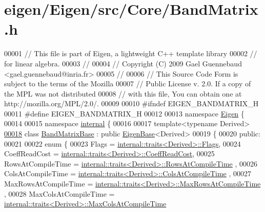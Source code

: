 \hypertarget{eigen_2_eigen_2src_2_core_2_band_matrix_8h_source}{}\section{eigen/\+Eigen/src/\+Core/\+Band\+Matrix.h}
\label{eigen_2_eigen_2src_2_core_2_band_matrix_8h_source}

\begin{DoxyCode}
00001 \textcolor{comment}{// This file is part of Eigen, a lightweight C++ template library}
00002 \textcolor{comment}{// for linear algebra.}
00003 \textcolor{comment}{//}
00004 \textcolor{comment}{// Copyright (C) 2009 Gael Guennebaud <gael.guennebaud@inria.fr>}
00005 \textcolor{comment}{//}
00006 \textcolor{comment}{// This Source Code Form is subject to the terms of the Mozilla}
00007 \textcolor{comment}{// Public License v. 2.0. If a copy of the MPL was not distributed}
00008 \textcolor{comment}{// with this file, You can obtain one at http://mozilla.org/MPL/2.0/.}
00009 
00010 \textcolor{preprocessor}{#ifndef EIGEN\_BANDMATRIX\_H}
00011 \textcolor{preprocessor}{#define EIGEN\_BANDMATRIX\_H}
00012 
00013 \textcolor{keyword}{namespace }\hyperlink{namespace_eigen}{Eigen} \{ 
00014 
00015 \textcolor{keyword}{namespace }\hyperlink{namespaceinternal}{internal} \{
00016 
00017 \textcolor{keyword}{template}<\textcolor{keyword}{typename} Derived>
\hyperlink{class_eigen_1_1internal_1_1_band_matrix_base}{00018} \textcolor{keyword}{class }\hyperlink{class_eigen_1_1internal_1_1_band_matrix_base}{BandMatrixBase} : \textcolor{keyword}{public} \hyperlink{group___core___module_struct_eigen_1_1_eigen_base}{EigenBase}<Derived>
00019 \{
00020   \textcolor{keyword}{public}:
00021 
00022     \textcolor{keyword}{enum} \{
00023       Flags = \hyperlink{struct_eigen_1_1internal_1_1traits}{internal::traits<Derived>::Flags},
00024       CoeffReadCost = \hyperlink{struct_eigen_1_1internal_1_1traits}{internal::traits<Derived>::CoeffReadCost},
00025       RowsAtCompileTime = \hyperlink{struct_eigen_1_1internal_1_1traits}{internal::traits<Derived>::RowsAtCompileTime}
      ,
00026       ColsAtCompileTime = \hyperlink{struct_eigen_1_1internal_1_1traits}{internal::traits<Derived>::ColsAtCompileTime}
      ,
00027       MaxRowsAtCompileTime = \hyperlink{struct_eigen_1_1internal_1_1traits}{internal::traits<Derived>::MaxRowsAtCompileTime}
      ,
00028       MaxColsAtCompileTime = \hyperlink{struct_eigen_1_1internal_1_1traits}{internal::traits<Derived>::MaxColsAtCompileTime}

\end{DoxyCode}
